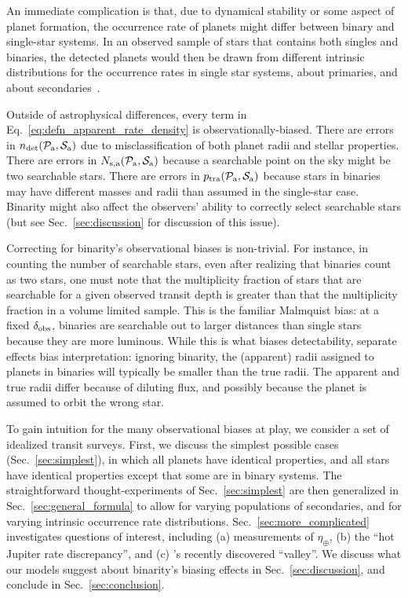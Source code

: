 \documentclass[12pt,modern]{aastex61}
\newcommand{\pp}{\mathcal{P}}
\newcommand{\ps}{\mathcal{S}}
\renewcommand{\a}{_{\rm a}}
\begin{document}
An immediate complication is that, due to dynamical stability or some 
aspect of planet formation, the occurrence rate of planets might differ 
between binary and single-star systems.
In an observed sample of stars that contains both singles and binaries, the 
detected planets would then be drawn from different intrinsic 
distributions for the occurrence rates in single star systems, 
about primaries, and about secondaries~\citep[{\it 
e.g},][]{wang_occurrence_2015}.

Outside of astrophysical differences, every term in 
Eq.~\ref{eq:defn_apparent_rate_density} is observationally-biased.
There are errors in $n_{\rm det}(\pp\a,\ps\a)$ due to misclassification of 
both planet radii and stellar properties.
There are errors in $N_{{\rm s,a}}(\pp\a,\ps\a)$ because a 
searchable point on the sky might be two searchable stars.
There are errors in $p_{\rm tra}(\pp\a,\ps\a)$ because stars in binaries may 
have different masses and radii than assumed in the single-star case.
Binarity might also affect the observers' ability to correctly select 
searchable stars (but see Sec.~\ref{sec:discussion} for discussion of this 
issue).

Correcting for binarity's observational biases is non-trivial.
For instance, in counting the number of searchable stars, even after realizing 
that binaries count as two stars, one must note that the multiplicity fraction 
of stars that are searchable for a given observed transit depth is greater 
than that the multiplicity fraction in a volume limited sample.
This is the familiar Malmquist bias: at a fixed $\delta_{\rm obs}$, binaries 
are searchable out to larger distances than single stars because they are more 
luminous.
While this is what biases detectability, separate effects bias interpretation:
ignoring binarity, the (apparent) radii assigned to planets in binaries will 
typically be smaller than the true radii.
The apparent and true radii differ because of diluting flux, and possibly 
because the planet is assumed to orbit the wrong 
star.

To gain intuition for the many observational biases at play,
we consider a set of idealized transit surveys.
First, we discuss the simplest possible cases (Sec.~\ref{sec:simplest}), in 
which all planets have identical properties, and all stars have identical 
properties except that some are in binary systems.
The straightforward thought-experiments of Sec.~\ref{sec:simplest} are then 
generalized in Sec.~\ref{sec:general_formula} to allow for varying populations 
of secondaries, and for varying intrinsic occurrence rate distributions.
Sec.~\ref{sec:more_complicated} investigates questions of interest, 
including (a) measurements of $\eta_\oplus$, (b) the ``hot Jupiter rate 
discrepancy'', and (c) \citet{fulton_california-_2017}'s 
recently discovered ``valley''.
We discuss what our models suggest about binarity's biasing effects in 
Sec.~\ref{sec:discussion}, and conclude in Sec.~\ref{sec:conclusion}.
\end{document}
